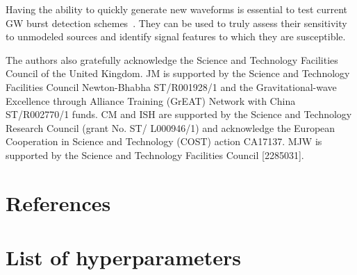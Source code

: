 \documentclass[12pt]{iopart}
\begin{document}
%
Having the ability to quickly generate new waveforms is essential to test current GW burst detection schemes~\cite{drago2020coherent,Klimenko_2008, Aso_2008}. They can be used to truly assess their sensitivity to unmodeled sources and identify signal features to which they are susceptible. 

\ack

The authors also gratefully acknowledge the Science and Technology Facilities Council of the United Kingdom. JM is supported by the Science and Technology Facilities Council Newton-Bhabha ST/R001928/1 and the Gravitational-wave Excellence through Alliance Training (GrEAT) Network with China ST/R002770/1 funds. CM and ISH are supported by the Science and Technology Research Council (grant No. ST/ L000946/1) and acknowledge the European Cooperation in Science and Technology (COST) action CA17137. MJW is supported by the Science and Technology Facilities Council [2285031].

\clearpage

\section*{References}


\clearpage

\appendix
\section{List of hyperparameters}
\end{document}
